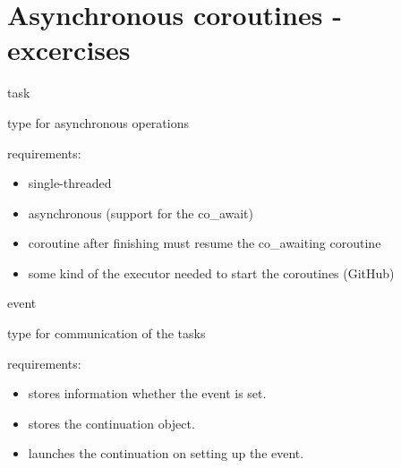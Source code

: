 \documentclass[10pt]{beamer}
\begin{document}
\section{Asynchronous coroutines - excercises}

\begin{frame}{task}
  \centerline{type for asynchronous operations}
  \vfill
  requirements:
  \begin{itemize}
    \item single-threaded
    \item asynchronous (support for the co\_await)
    \item coroutine after finishing must resume the co\_awaiting coroutine
    \item some kind of the executor needed to start the coroutines (GitHub)
  \end{itemize}
\end{frame}

\begin{frame}{event}
  \centerline{type for communication of the tasks}
  \vfill
  requirements:
  \begin{itemize}
  \item stores information whether the event is set.
  \item stores the continuation object.
  \item launches the continuation on setting up the event.
  \end{itemize}
\end{frame}
\end{document}
